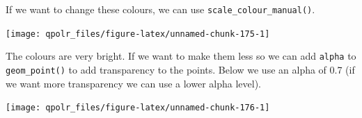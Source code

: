 \documentclass[12pt,oneside]{reedthesis}
\theoremstyle{definition}
\theoremstyle{definition}
\theoremstyle{definition}
\theoremstyle{remark}
\begin{document}
  If we want to change these colours, we can use
  \texttt{scale\_colour\_manual()}.
  \begin{Shaded}
  \begin{Highlighting}[]
  \NormalTok{(}\OperatorTok{+}
  \StringTok{  }\NormalTok{(}\NormalTok{(}\OperatorTok{+}\StringTok{ }
  \StringTok{  }\NormalTok{(}\NormalTok{, }\NormalTok{) }\OperatorTok{+}
  \StringTok{  }\NormalTok{() }\OperatorTok{+}
  \StringTok{  }\NormalTok{(} \NormalTok{(}\NormalTok{, }\NormalTok{, }\NormalTok{)) }
  \end{Highlighting}
  \end{Shaded}
  \begin{center}\texttt{[image: qpolr\_files/figure-latex/unnamed-chunk-175-1]} \end{center}
  
  The colours are very bright. If we want to make them less so we can add
  \texttt{alpha} to \texttt{geom\_point()} to add transparency to the
  points. Below we use an alpha of 0.7 (if we want more transparency we
  can use a lower alpha level).
  \begin{Shaded}
  \begin{Highlighting}[]
  \NormalTok{(}\OperatorTok{+}
  \StringTok{  }\NormalTok{(}\NormalTok{(}\NormalTok{) }\OperatorTok{+}\StringTok{ }
  \StringTok{  }\NormalTok{(}\NormalTok{, }\NormalTok{) }\OperatorTok{+}
  \StringTok{  }\NormalTok{() }\OperatorTok{+}
  \StringTok{  }\NormalTok{(} \NormalTok{(}\NormalTok{, }\NormalTok{, }\NormalTok{)) }
  \end{Highlighting}
  \end{Shaded}
  \begin{center}\texttt{[image: qpolr\_files/figure-latex/unnamed-chunk-176-1]} \end{center}
  
\end{document}
